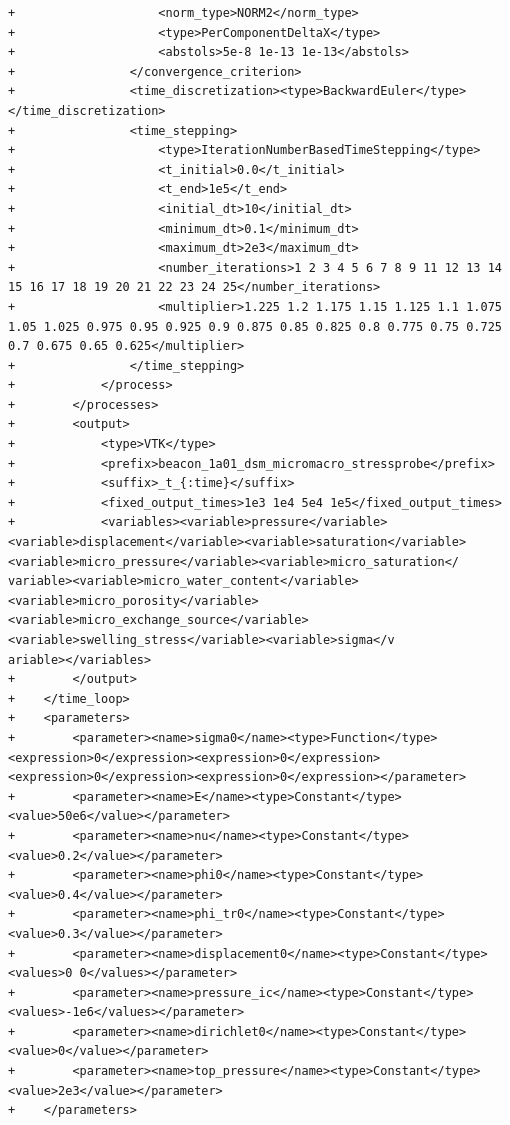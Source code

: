 \documentclass[10pt]{article}
\begin{document}
\begin{lstlisting}
+                    <norm_type>NORM2</norm_type>
+                    <type>PerComponentDeltaX</type>
+                    <abstols>5e-8 1e-13 1e-13</abstols>
+                </convergence_criterion>
+                <time_discretization><type>BackwardEuler</type></time_discretization>
+                <time_stepping>
+                    <type>IterationNumberBasedTimeStepping</type>
+                    <t_initial>0.0</t_initial>
+                    <t_end>1e5</t_end>
+                    <initial_dt>10</initial_dt>
+                    <minimum_dt>0.1</minimum_dt>
+                    <maximum_dt>2e3</maximum_dt>
+                    <number_iterations>1 2 3 4 5 6 7 8 9 11 12 13 14 15 16 17 18 19 20 21 22 23 24 25</number_iterations>
+                    <multiplier>1.225 1.2 1.175 1.15 1.125 1.1 1.075 1.05 1.025 0.975 0.95 0.925 0.9 0.875 0.85 0.825 0.8 0.775 0.75 0.725 0.7 0.675 0.65 0.625</multiplier>
+                </time_stepping>
+            </process>
+        </processes>
+        <output>
+            <type>VTK</type>
+            <prefix>beacon_1a01_dsm_micromacro_stressprobe</prefix>
+            <suffix>_t_{:time}</suffix>
+            <fixed_output_times>1e3 1e4 5e4 1e5</fixed_output_times>
+            <variables><variable>pressure</variable><variable>displacement</variable><variable>saturation</variable><variable>micro_pressure</variable><variable>micro_saturation</
variable><variable>micro_water_content</variable><variable>micro_porosity</variable><variable>micro_exchange_source</variable><variable>swelling_stress</variable><variable>sigma</v
ariable></variables>
+        </output>
+    </time_loop>
+    <parameters>
+        <parameter><name>sigma0</name><type>Function</type><expression>0</expression><expression>0</expression><expression>0</expression><expression>0</expression></parameter>
+        <parameter><name>E</name><type>Constant</type><value>50e6</value></parameter>
+        <parameter><name>nu</name><type>Constant</type><value>0.2</value></parameter>
+        <parameter><name>phi0</name><type>Constant</type><value>0.4</value></parameter>
+        <parameter><name>phi_tr0</name><type>Constant</type><value>0.3</value></parameter>
+        <parameter><name>displacement0</name><type>Constant</type><values>0 0</values></parameter>
+        <parameter><name>pressure_ic</name><type>Constant</type><values>-1e6</values></parameter>
+        <parameter><name>dirichlet0</name><type>Constant</type><value>0</value></parameter>
+        <parameter><name>top_pressure</name><type>Constant</type><value>2e3</value></parameter>
+    </parameters>

\end{lstlisting}
\end{document}
